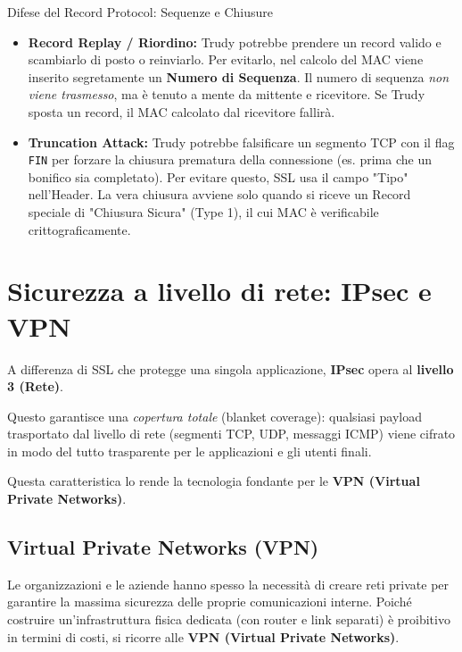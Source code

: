 \documentclass[a4paper,12pt]{report}
\begin{document}
\begin{urgentbox}{Difese del Record Protocol: Sequenze e Chiusure}
\begin{itemize}
    \item \textbf{Record Replay / Riordino:} Trudy potrebbe prendere un record valido e scambiarlo di posto o reinviarlo. Per evitarlo, nel calcolo del MAC viene inserito segretamente un \textbf{Numero di Sequenza}. Il numero di sequenza \textit{non viene trasmesso}, ma è tenuto a mente da mittente e ricevitore. Se Trudy sposta un record, il MAC calcolato dal ricevitore fallirà.
    \item \textbf{Truncation Attack:} Trudy potrebbe falsificare un segmento TCP con il flag \texttt{FIN} per forzare la chiusura prematura della connessione (es. prima che un bonifico sia completato). Per evitare questo, SSL usa il campo "Tipo" nell'Header. La vera chiusura avviene solo quando si riceve un Record speciale di "Chiusura Sicura" (Type 1), il cui MAC è verificabile crittograficamente.
\end{itemize}
\end{urgentbox}

\newpage
\newpage
\section{Sicurezza a livello di rete: IPsec e VPN}

A differenza di SSL che protegge una singola applicazione, \textbf{IPsec} opera al \textbf{livello 3 (Rete)}. 

Questo garantisce una \textit{copertura totale} (blanket coverage): qualsiasi payload trasportato dal livello di rete (segmenti TCP, UDP, messaggi ICMP) viene cifrato in modo del tutto trasparente per le applicazioni e gli utenti finali. 

Questa caratteristica lo rende la tecnologia fondante per le \textbf{VPN (Virtual Private Networks)}.

\subsection{Virtual Private Networks (VPN)}

Le organizzazioni e le aziende hanno spesso la necessità di creare reti private per garantire la massima sicurezza delle proprie comunicazioni interne. Poiché costruire un'infrastruttura fisica dedicata (con router e link separati) è proibitivo in termini di costi, si ricorre alle \textbf{VPN (Virtual Private Networks)}. 
\end{document}
